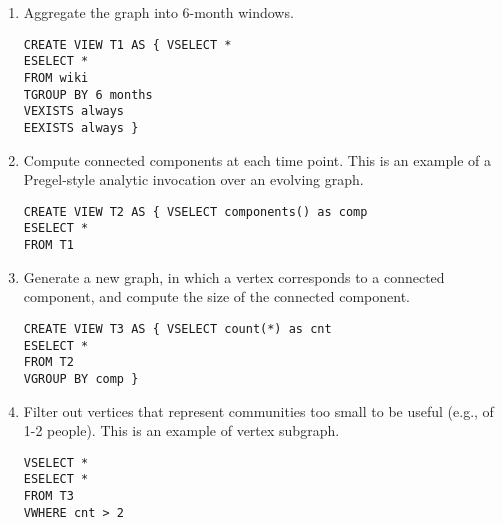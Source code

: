 \begin{enumerate}[noitemsep,itemindent=\dimexpr\labelwidth+\labelsep\relax,leftmargin=0pt]
\item Aggregate the graph into 6-month windows.

\vspace{-0.1cm}
\begin{small} 
\begin{verbatim}
CREATE VIEW T1 AS { VSELECT *
ESELECT *
FROM wiki
TGROUP BY 6 months
VEXISTS always
EEXISTS always }
\end{verbatim}
\end{small}

\item Compute connected components at each time point.  This is an
  example of a Pregel-style analytic invocation over an evolving
  graph. 

\vspace{-0.1cm}
\begin{small} 
\begin{verbatim}
CREATE VIEW T2 AS { VSELECT components() as comp
ESELECT *
FROM T1
\end{verbatim}
\end{small}


\item Generate a new graph, in which a vertex corresponds to a
  connected component, and compute the size of the connected
  component. 

\vspace{-0.1cm}
\begin{small} 
\begin{verbatim}
CREATE VIEW T3 AS { VSELECT count(*) as cnt
ESELECT *
FROM T2
VGROUP BY comp }
\end{verbatim}
\end{small}

\item Filter out vertices that represent communities too small to be
  useful (e.g., of 1-2 people).  This is an example of vertex
  subgraph.  

\vspace{-0.1cm}
\begin{small} 
\begin{verbatim}
VSELECT *
ESELECT *
FROM T3
VWHERE cnt > 2
\end{verbatim}
\end{small}
\end{enumerate}

